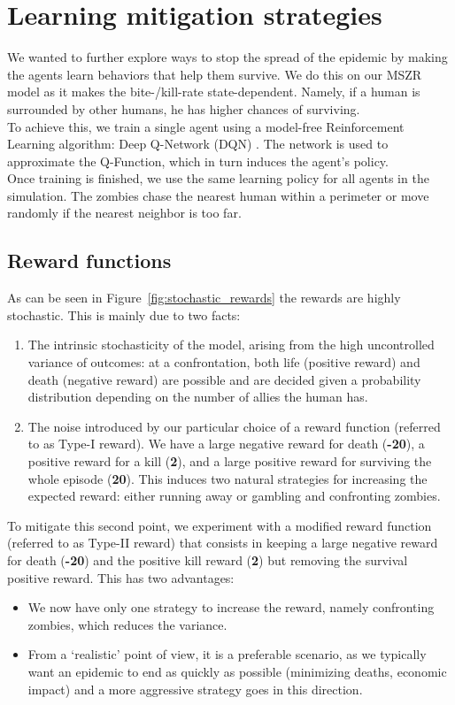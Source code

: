 \documentclass[11pt]{article}
\begin{document}
\section{Learning mitigation strategies}
We wanted to further explore ways to stop the spread of the epidemic by making the agents learn behaviors that help them survive. We do this on our MSZR model as it makes the bite-/kill-rate state-dependent. Namely, if a human is surrounded by other humans, he has higher chances of surviving.\\
To achieve this, we train a single agent using a model-free Reinforcement Learning algorithm: Deep Q-Network (DQN) \cite{DQN}. The network is used to approximate the Q-Function, which in turn induces the agent's policy.\\ Once training is finished, we use the same learning policy for all agents in the simulation. The zombies chase the nearest human within a perimeter or move randomly if the nearest neighbor is too far.

\subsection{Reward functions}
As can be seen in Figure~\ref{fig:stochastic_rewards} the rewards are highly stochastic. This is mainly due to two facts:
\begin{enumerate}
    \item The intrinsic stochasticity of the model, arising from the high uncontrolled variance of outcomes: at a confrontation, both life (positive reward) and death (negative reward) are possible and are decided given a probability distribution depending on the number of allies the human has.
    \item The noise introduced by our particular choice of a reward function (referred to as Type-I reward). We have a large negative reward for death (\textbf{-20}), a positive reward for a kill (\textbf{2}), and a large positive reward for surviving the whole episode (\textbf{20}). This induces two natural strategies for increasing the expected reward: either running away or gambling and confronting zombies.
\end{enumerate}
To mitigate this second point, we experiment with a modified reward function (referred to as Type-II reward) that consists in keeping a large negative reward for death (\textbf{-20}) and the positive kill reward (\textbf{2}) but removing the survival positive reward. This has two advantages:
\begin{itemize}
    \item We now have only one strategy to increase the reward, namely confronting zombies, which reduces the variance.
    \item From a `realistic' point of view, it is a preferable scenario, as we typically want an epidemic to end as quickly as possible (minimizing deaths, economic impact) and a more aggressive strategy goes in this direction.
\end{itemize}
\end{document}
